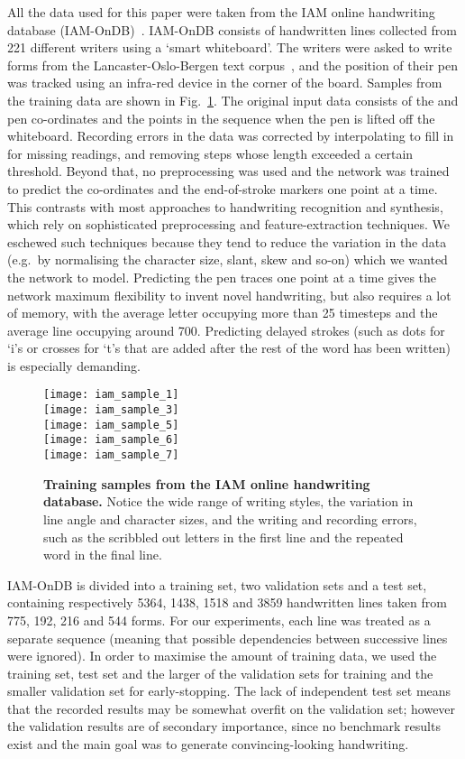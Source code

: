 \documentclass{article}
\newcommand{\eg}{e.g.\ }
\newcommand{\flabel}[1]{\label{fig:#1}}
\newcommand{\fref}[1]{Fig.~\ref{fig:#1}}
\begin{document}
All the data used for this paper were taken from the IAM online handwriting database (IAM-OnDB)~\cite{liwicki05iam}.
IAM-OnDB consists of handwritten lines collected from 221 different writers using a `smart whiteboard'.
The writers were asked to write forms from the Lancaster-Oslo-Bergen text corpus~\cite{lob}, and the position of their pen was tracked using an infra-red device in the corner of the board. 
Samples from the training data are shown in \fref{iam_data}.
The original input data consists of the  and  pen co-ordinates and the points in the sequence when the pen is lifted off the whiteboard.
Recording errors in the  data was corrected by interpolating to fill in for missing readings, and removing steps whose length exceeded a certain threshold.
Beyond that, no preprocessing was used and the network was trained to predict the  co-ordinates and the end-of-stroke markers one point at a time.
This contrasts with most approaches to handwriting recognition and synthesis, which rely on sophisticated preprocessing and feature-extraction techniques.
We eschewed such techniques because they tend to reduce the variation in the data (\eg by normalising the character size, slant, skew and so-on) which we wanted the network to model.
Predicting the pen traces one point at a time gives the network maximum flexibility to invent novel handwriting, but also requires a lot of memory, with the average letter occupying more than 25 timesteps and the average line occupying around 700.
Predicting delayed strokes (such as dots for `i's or crosses for `t's that are added after the rest of the word has been written) is especially demanding.

\begin{figure}
\texttt{[image: iam\_sample\_1]}\\
\texttt{[image: iam\_sample\_3]}\\
\texttt{[image: iam\_sample\_5]}\\
\texttt{[image: iam\_sample\_6]}\\
\texttt{[image: iam\_sample\_7]}
\caption{\textbf{Training samples from the IAM online handwriting database.} Notice the wide range of writing styles, the variation in line angle and character sizes, and the writing and recording errors, such as the scribbled out letters in the first line and the repeated word in the final line.}
\flabel{iam_data}
\end{figure}

IAM-OnDB is divided into a training set, two validation sets and a test set, containing respectively 5364, 1438, 1518 and 3859 handwritten lines taken from 775, 192, 216 and 544 forms. 
For our experiments, each line was treated as a separate sequence (meaning that possible dependencies between successive lines were ignored).
In order to maximise the amount of training data, we used the training set, test set and the larger of the validation sets for training and the smaller validation set for early-stopping.
The lack of independent test set means that the recorded results may be somewhat overfit on the validation set; however the validation results are of secondary importance, since no benchmark results exist and the main goal was to generate convincing-looking handwriting.
\end{document}

